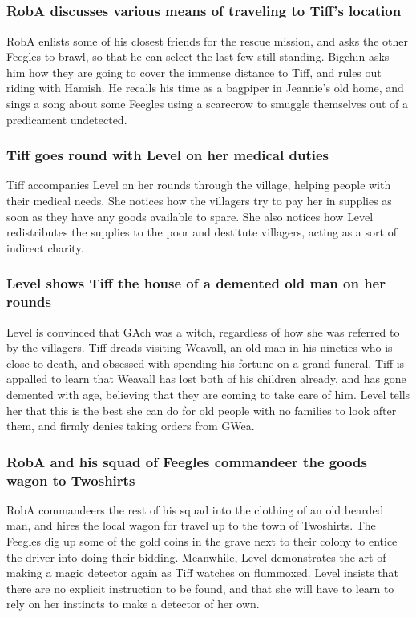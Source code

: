 \subsection{}
\subsubsection{\Gls{RobA} discusses various means of traveling to \Gls{Tiff}'s location}
\Gls{RobA} enlists some of his closest friends for the rescue mission, and asks the other Feegles
to brawl, so that he can select the last few still standing. \Gls{Bigchin} asks him how they are
going to cover the immense distance to \Gls{Tiff}, and rules out riding with \Gls{Hamish}. He
recalls his time as a bagpiper in \Gls{Jeannie}'s old home, and sings a song about some Feegles
using a scarecrow to smuggle themselves out of a predicament undetected.

\subsubsection{\Gls{Tiff} goes round with \Gls{Level} on her medical duties}
\Gls{Tiff} accompanies \Gls{Level} on her rounds through the village, helping people with their
medical needs. She notices how the villagers try to pay her in supplies as soon as they have any
goods available to spare. She also notices how \Gls{Level} redistributes the supplies to the
poor and destitute villagers, acting as a sort of indirect charity.

\subsubsection{\Gls{Level} shows \Gls{Tiff} the house of a demented old man on her rounds}
\Gls{Level} is convinced that \Gls{GAch} was a witch, regardless of how she was referred to by the
villagers. \Gls{Tiff} dreads visiting \Gls{Weavall}, an old man in his nineties who is close to
death, and obsessed with spending his fortune on a grand funeral. \Gls{Tiff} is appalled to learn
that \Gls{Weavall} has lost both of his children already, and has gone demented with age,
believing that they are coming to take care of him. \Gls{Level} tells her that this is the best she
can do for old people with no families to look after them, and firmly denies taking orders from
\Gls{GWea}.

\subsubsection{\Gls{RobA} and his squad of Feegles commandeer the goods wagon to Twoshirts}
\Gls{RobA} commandeers the rest of his squad into the clothing of an old bearded man, and hires
the local wagon for travel up to the town of Twoshirts. The Feegles dig up some of the gold coins
in the grave next to their colony to entice the driver into doing their bidding. Meanwhile,
\Gls{Level} demonstrates the art of making a magic detector again as \Gls{Tiff} watches on
flummoxed. \Gls{Level} insists that there are no explicit instruction to be found, and that she will
have to learn to rely on her instincts to make a detector of her own.

